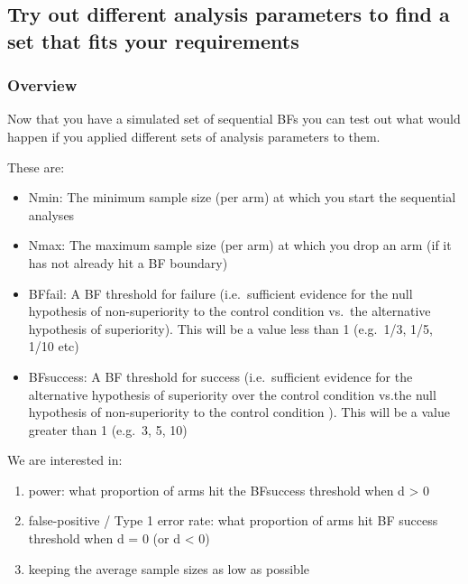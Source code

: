 \documentclass[
]{book}
\begin{document}
\hypertarget{try-out-different-analysis-parameters-to-find-a-set-that-fits-your-requirements}{%
\subsection{Try out different analysis parameters to find a set that fits your requirements}\label{try-out-different-analysis-parameters-to-find-a-set-that-fits-your-requirements}}

\hypertarget{overview}{%
\subsubsection{Overview}\label{overview}}

Now that you have a simulated set of sequential BFs you can test out what would happen if you applied different sets of analysis parameters to them.

These are:

\begin{itemize}
\item
  Nmin: The minimum sample size (per arm) at which you start the sequential analyses
\item
  Nmax: The maximum sample size (per arm) at which you drop an arm (if it has not already hit a BF boundary)
\item
  BFfail: A BF threshold for failure (i.e.~sufficient evidence for the null hypothesis of non-superiority to the control condition vs.~the alternative hypothesis of superiority). This will be a value less than 1 (e.g.~1/3, 1/5, 1/10 etc)
\item
  BFsuccess: A BF threshold for success (i.e.~sufficient evidence for the alternative hypothesis of superiority over the control condition vs.the null hypothesis of non-superiority to the control condition ). This will be a value greater than 1 (e.g.~3, 5, 10)
\end{itemize}

We are interested in:

\begin{enumerate}
\def\labelenumi{\roman{enumi})}
\item
  power: what proportion of arms hit the BFsuccess threshold when d \textgreater{} 0
\item
  false-positive / Type 1 error rate: what proportion of arms hit BF success threshold when d = 0 (or d \textless{} 0)
\item
  keeping the average sample sizes as low as possible
\end{enumerate}
\end{document}
